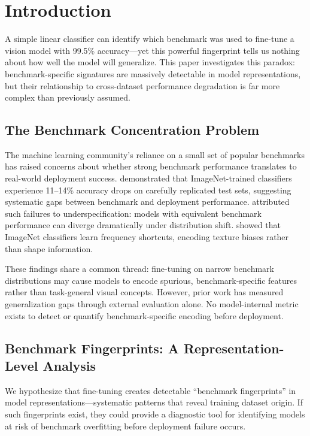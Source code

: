 \section{Introduction}
\label{sec:introduction}

A simple linear classifier can identify which benchmark was used to fine-tune a vision model with 99.5\% accuracy---yet this powerful fingerprint tells us nothing about how well the model will generalize. This paper investigates this paradox: benchmark-specific signatures are massively detectable in model representations, but their relationship to cross-dataset performance degradation is far more complex than previously assumed.

\subsection{The Benchmark Concentration Problem}

The machine learning community's reliance on a small set of popular benchmarks has raised concerns about whether strong benchmark performance translates to real-world deployment success. \citet{recht2019imagenet} demonstrated that ImageNet-trained classifiers experience 11--14\% accuracy drops on carefully replicated test sets, suggesting systematic gaps between benchmark and deployment performance. \citet{damour2020underspecification} attributed such failures to underspecification: models with equivalent benchmark performance can diverge dramatically under distribution shift. \citet{wang2025imagenet} showed that ImageNet classifiers learn frequency shortcuts, encoding texture biases rather than shape information.

These findings share a common thread: fine-tuning on narrow benchmark distributions may cause models to encode spurious, benchmark-specific features rather than task-general visual concepts. However, prior work has measured generalization gaps through external evaluation alone. No model-internal metric exists to detect or quantify benchmark-specific encoding before deployment.

\subsection{Benchmark Fingerprints: A Representation-Level Analysis}

We hypothesize that fine-tuning creates detectable ``benchmark fingerprints'' in model representations---systematic patterns that reveal training dataset origin. If such fingerprints exist, they could provide a diagnostic tool for identifying models at risk of benchmark overfitting before deployment failure occurs.

